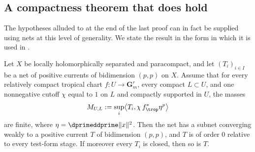 \subsection{A compactness theorem that does hold}
\label{sec:ch14-compactness-positive}

The hypotheses alluded to at the end of the last proof can in fact be
supplied using nets at this level of generality.  We state the result in the
form in which it is used in
.

\begin{theorem}
\label{thm:ch14-positive-compactness}
Let $X$ be locally holomorphically separated and paracompact, and let
$(T_i)_{i\in I}$ be a net of positive currents of bidimension $(p,p)$ on $X$.
Assume that for every relatively compact tropical chart $f:U\to\mathbf
G_m^r$, every compact $L\subset U$, and one nonnegative cutoff $\chi$ equal to
$1$ on $L$ and compactly supported in $U$, the masses
\[
 M_{U,L}:=\sup_i\bigl\langle T_i,\chi\,f_{\trop}^*\eta^{p}\bigr\rangle
\]
are finite, where $\eta=\dprimeddprime\|x\|^2$.  Then the net has a subnet
converging weakly to a positive current $T$ of bidimension $(p,p)$, and $T$
is of order $0$ relative to every test-form stage.  If moreover every $T_i$ is
closed, then so is $T$.
\end{theorem}

